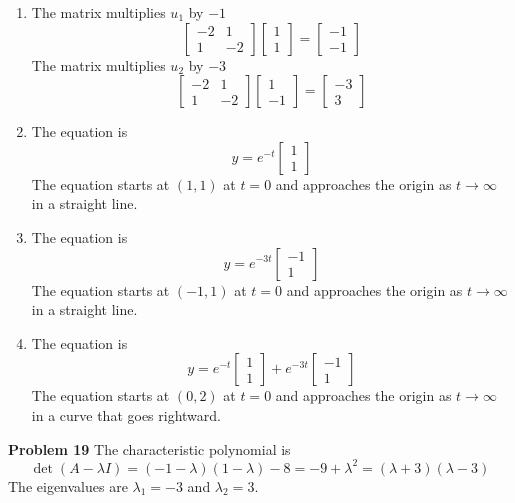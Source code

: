 \begin{enumerate}
    \item The matrix multiplies $u_1$ by $-1$
    \[
        \begin{bmatrix}
            -2 & 1 \\
            1 & -2
        \end{bmatrix}
        \begin{bmatrix}
            1 \\ 1
        \end{bmatrix}
        = \begin{bmatrix}
            -1 \\ -1
        \end{bmatrix}
    \]
    The matrix multiplies $u_2$ by $-3$
    \[
        \begin{bmatrix}
            -2 & 1 \\
            1 & -2
        \end{bmatrix}
        \begin{bmatrix}
            1 \\ -1
        \end{bmatrix}
        = \begin{bmatrix}
            -3 \\ 3
        \end{bmatrix}
    \]
    \item The equation is \[
        y = e^{-t} \begin{bmatrix}
            1 \\ 1
        \end{bmatrix}
    \]
    The equation starts at $(1,1)$ at $t=0$ and approaches 
    the origin as $t \to \infty$ in a straight line.
    \item The equation is \[
        y = e^{-3t} \begin{bmatrix}
            -1 \\ 1
        \end{bmatrix}
    \]
    The equation starts at $(-1,1)$ at $t=0$ and approaches 
    the origin as $t \to \infty$ in a straight line.
    \item The equation is \[
        y = e^{-t} \begin{bmatrix}
            1 \\ 1
        \end{bmatrix}
        +
        e^{-3t} \begin{bmatrix}
            -1 \\ 1
        \end{bmatrix}
    \]
    The equation starts at $(0, 2)$ at $t=0$ and approaches 
    the origin as $t \to \infty$ in a curve that goes rightward.
\end{enumerate}
\textbf{Problem 19}
The characteristic polynomial is 
\[
    \det(A-\lambda I)
    = (-1-\lambda)(1-\lambda) - 8
    = -9 + \lambda^2
    = (\lambda + 3)(\lambda - 3)
\]
The eigenvalues are $\lambda_1 = -3$ and $\lambda_2 = 3$.

